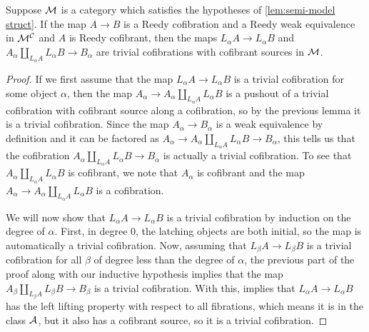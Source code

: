 \documentclass{amsart}
\begin{document}
\begin{lem}\label{lem:LA->LB triv cofib}
    Suppose $\mathcal{M}$ is a category which satisfies the hypotheses of \ref{lem:semi-model struct}. If the map $A\to B$ is a Reedy cofibration and a Reedy weak equivalence in $\mathcal{M}^{\mathcal{C}}$ and $A$ is Reedy cofibrant, then the maps $L_\alpha A\to L_\alpha B$ and $A_\alpha\coprod_{L_\alpha A}L_\alpha B\to B_\alpha$ are trivial cofibrations with cofibrant sources in $\mathcal{M}$.
\end{lem}
\begin{proof}
    If we first assume that the map $L_\alpha A\to L_\alpha B$ is a trivial cofibration for some object $\alpha$, then the map $A_\alpha\to A_\alpha\coprod_{L_\alpha A}L_\alpha B$ is a pushout of a trivial cofibration with cofibrant source along a cofibration, so by the previous lemma it is a trivial cofibration. Since the map $A_\alpha\to B_\alpha$ is a weak equivalence by definition and it can be factored as $A_\alpha\to A_\alpha\coprod_{L_\alpha A}L_\alpha B\to B_\alpha$, this tells us that the cofibration $A_\alpha\coprod_{L_\alpha A}L_\alpha B\to B_\alpha$ is actually a trivial cofibration. To see that $A_\alpha\coprod_{L_\alpha A}L_\alpha B$ is cofibrant, we note that $A_\alpha$ is cofibrant and the map $A_\alpha\to A_\alpha\coprod_{L_\alpha A}L_\alpha B$ is a cofibration.

    We will now show that $L_\alpha A\to L_\alpha B$ is a trivial cofibration by induction on the degree of $\alpha$. First, in degree 0, the latching objects are both initial, so the map is automatically a trivial cofibration. Now, assuming that $L_\beta A\to L_\beta B$ is a trivial cofibration for all $\beta$ of degree less than the degree of $\alpha$, the previous part of the proof along with our inductive hypothesis implies that the map $A_\beta\coprod_{L_\beta A}L_\beta B\to B_\beta$ is a trivial cofibration. With this, \cite[lem. 15.3.9]{Hirshhorn} implies that $L_\alpha A\to L_\alpha B$ has the left lifting property with respect to all fibrations, which means it is in the class $\mathcal{A}$, but it also has a cofibrant source, so it is a trivial cofibration.
\end{proof}
\end{document}
